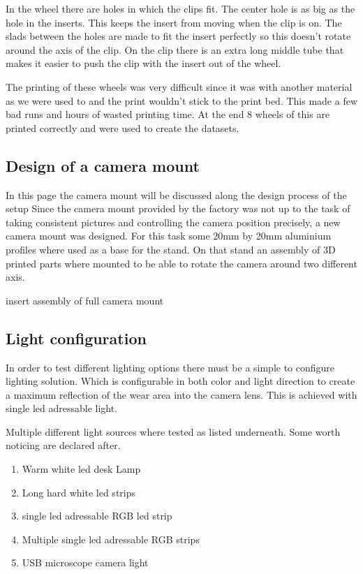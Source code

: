 		In the wheel there are holes in which the clips fit. The center hole is as big as the hole in the inserts. This keeps the insert from moving when the clip is on. The slads between the holes are made to fit the insert perfectly so this doesn't rotate around the axis of the clip. On the clip there is an extra long middle tube that makes it easier to push the clip with the insert out of the wheel.

The printing of these wheels was very difficult since it was with another material as we were used to and the print wouldn't stick to the print bed. This made a few bad runs and hours of wasted printing time. At the end 8 wheels of this are printed correctly and were used to create the datasets.
		
	\subsection{Design of a camera mount}
	In this page the camera mount will be discussed along the design process of the setup
		Since the camera mount provided by the factory was not up to the task of taking consistent pictures and controlling the camera position precisely, a new camera mount was designed. For this task some 20mm by 20mm aluminium profiles where used as a base for the stand. On that stand an assembly of 3D printed parts where mounted to be able to rotate the camera around two different axis. 
		
		insert assembly of full camera mount
		
	\subsection{Light configuration}
	In order to test different lighting options there must be a simple to configure lighting solution. Which is configurable in both color and light direction to create a maximum reflection of the wear area into the camera lens. This is achieved with single led adressable light.
	
	Multiple different light sources where tested as listed underneath. Some worth noticing are declared after.

		\begin{enumerate}
			\item Warm white led desk Lamp
			\item Long hard white led strips 
			\item single led adressable RGB led strip
			\item Multiple single led adressable RGB strips
			\item USB microscope camera light
		\end{enumerate}
		
